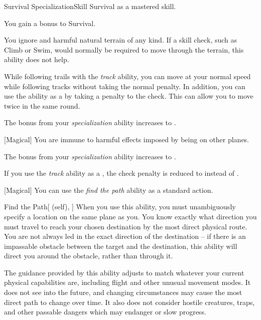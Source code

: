     \begin{feat}{Survival Specialization}{Skill}
        \featpre Survival as a mastered skill.

         You gain a  bonus to Survival.

         You ignore  and harmful natural terrain of any kind.
        If a skill check, such as Climb or Swim, would normally be required to move through the terrain, this ability does not help.

        While following trails with the \textit{track} ability, you can move at your normal speed while following tracks without taking the normal  penalty.
        In addition, you can use the ability as a  by taking a  penalty to the check.
        This can allow you to move twice in the same round.

         The bonus from your \textit{specialization} ability increases to .

        [Magical] You are immune to harmful effects imposed by being on other planes.

         The bonus from your \textit{specialization} ability increases to .

         If you use the \textit{track} ability as a , the check penalty is reduced to  instead of .

        [Magical] You can use the \textit{find the path} ability as a standard action.
        \begin{attuneability}{Find the Path}[ (self), ]
            When you use this ability, you must unambiguously specify a location on the same plane as you.
            You know exactly what direction you must travel to reach your chosen destination by the most direct physical route.
            You are not always led in the exact direction of the destination -- if there is an impassable obstacle between the target and the destination, this ability will direct you around the obstacle, rather than through it.

            The guidance provided by this ability adjusts to match whatever your current physical capabilities are, including flight and other unusual movement modes. It does not see into the future, and changing circumstances may cause the most direct path to change over time.
            It also does not consider hostile creatures, traps, and other passable dangers which may endanger or slow progress.
        \end{attuneability}
    \end{feat}

